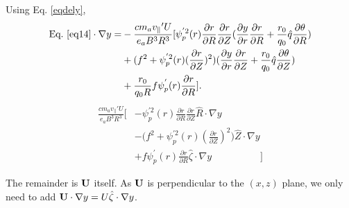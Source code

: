 \documentclass[12pt]{article}
\begin{document}
\begin{CJK*}{UTF8}{gbsn}
Using Eq. \ref{eqdely},
\begin{equation}
\begin{split}
    \textrm{Eq.}\ \ref{eq14} \cdot\nabla y =& -\frac{cm_av_{\parallel}{'}U}{e_aB^3R^3}[\psi_p^{'2}(r)\frac{\partial r}{\partial R}\frac{\partial r}{\partial Z}
    (\frac{\partial y}{\partial r}\frac{\partial r}{\partial R} + \frac{r_0}{q_0}\hat{q}\frac{\partial \theta}{\partial R})\\
    &+ (f^2 + \psi_p^{'2}(r)(\frac{\partial r}{\partial Z})^2)(\frac{\partial y}{\partial r}\frac{\partial r}{\partial Z} + 
    \frac{r_0}{q_0}\hat{q}\frac{\partial \theta}{\partial Z})\\
    &+ \frac{r_0}{q_0R}f\psi_p^{'}(r)\frac{\partial r}{\partial R}].
\end{split}
\end{equation}
{\color{blue}
\begin{equation*}
    \begin{split}
        \frac{cm_av_{\parallel}{'}U}{e_aB^3R^3}\bigg[&-\psi_p^{'2}(r)\frac{\partial r}{\partial R}\frac{\partial r}{\partial Z}
        \hat{R}\cdot\nabla y\\
        &- \bigg(f^2 + \psi_p^{'2}(r)(\frac{\partial r}{\partial Z})^2\bigg)\hat{Z}\cdot\nabla y\\
        &+ f\psi_p^{'}(r)\frac{\partial r}{\partial R}\hat{\zeta}\cdot\nabla y\qquad\qquad\quad\bigg]
    \end{split}
\end{equation*}
}

The remainder is $\bf U$ itself. As $\bf U$ is perpendicular to the $(x,z)$ plane, we only need to add
${\bf U}\cdot\nabla y = U\hat{\zeta}\cdot\nabla y$.
  

\newpage

\end{CJK*}
\end{document}
